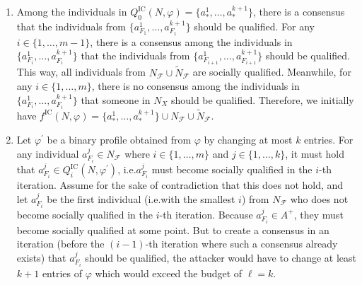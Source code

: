 \documentclass[
    12pt,               %
    a4paper,            %
    bibtotoc,           %
    pointlessnumbers,   %
    ngerman,            %
    titlepage,          %
    leqno,              %
    ]{scrarticle}       %
\begin{document}
\begin{Proof}
\begin{enumerate}[
    topsep=-4pt,
    leftmargin=*,
    itemindent=4.96em,
    label={\textit{Fact \ref*{thm:ic_cgmb_npc}.\arabic*}:},
    ref={\ref*{thm:ic_cgmb_npc}.\arabic*}
]
\item \label{fact:ic_cgmb_chain}
Among the individuals in $Q^{\text{IC}}_0(N, \varphi) = \{ a^1_\ast, \ldots, a^{k+1}_\ast \}$, there is a consensus that the individuals from $\{ a^1_{F_1}, \ldots, a^{k+1}_{F_1} \}$ should be qualified. For any $i \in \{ 1, \ldots, m-1 \}$, there is a consensus among the individuals in $\{ a^1_{F_i}, \ldots, a^{k+1}_{F_i} \}$ that the individuals from $\{ a^1_{F_{i+1}}, \ldots, a^{k+1}_{F_{i+1}} \}$ should be qualified. This way, all individuals from $N_\mathcal{F} \cup \tilde{N}_\mathcal{F}$ are socially qualified. Meanwhile, for any $i \in \{ 1, \ldots, m \}$, there is no consensus among the individuals in $\{ a^1_{F_i}, \ldots, a^{k+1}_{F_i} \}$ that someone in $N_X$ should be qualified. Therefore, we initially have $f^{\text{IC}}(N, \varphi) = \{ a^1_\ast, \ldots, a^{k+1}_\ast \} \cup N_\mathcal{F} \cup \tilde{N}_\mathcal{F}$.

\item \label{fact:ic_cgmb_a_fi_must_be_in_q_i}
Let $\varphi^\prime$ be a binary profile obtained from $\varphi$ by changing at most $k$ entries. For any individual $a^j_{F_i} \in N_\mathcal{F}$ where $i \in \{ 1, \ldots, m \}$ and $j \in \{ 1, \ldots, k \}$, it must hold that $a^j_{F_i} \in Q^{\text{IC}}_i(N, \varphi^\prime)$, i.e.\@ $a^j_{F_i}$ must become socially qualified in the $i$-th iteration. Assume for the sake of contradiction that this does not hold, and let $a^j_{F_i}$ be the first individual (i.e.\@ with the smallest $i$) from $N_\mathcal{F}$ who does not become socially qualified in the $i$-th iteration. Because $a^j_{F_i} \in A^+$, they must become socially qualified at some point. But to create a consensus in an iteration (before the $(i-1)$-th iteration where such a consensus already exists) that $a^j_{F_i}$ should be qualified, the attacker would have to change at least $k+1$ entries of $\varphi$ which would exceed the budget of $\ell = k$.


\end{enumerate}
\end{Proof}
\end{document}
